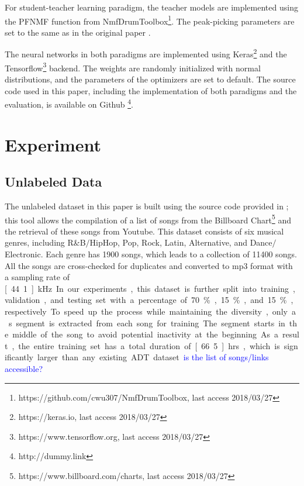 \documentclass{article}
\newcommand{\comment}[1]{{\textcolor{blue}{#1}}}
\begin{document}
For student-teacher learning paradigm, the teacher models are implemented using the PFNMF function from NmfDrumToolbox\footnote{https://github.com/cwu307/NmfDrumToolbox, last access 2018/03/27}. The peak-picking parameters are set to the same as in the original paper \cite{Wu2017}.

The neural networks in both paradigms are implemented using Keras\footnote{https://keras.io, last access 2018/03/27} and the Tensorflow\footnote{https://www.tensorflow.org, last access 2018/03/27} backend. The weights are randomly initialized with normal distributions, and the parameters of the optimizers are set to default. The source code used in this paper, including the implementation of both paradigms and the evaluation, is available on Github \footnote{http://dummy.link}.

\section{Experiment}
\label{sec:experiment}

\subsection{Unlabeled Data}

The unlabeled dataset in this paper is built using the source code provided in \cite{Wu2017}; this tool allows the compilation of a list of songs from the Billboard Chart\footnote{https://www.billboard.com/charts, last access 2018/03/27} and the retrieval of these songs from Youtube. This dataset consists of six musical genres, including R\&B$\slash$HipHop, Pop, Rock, Latin, Alternative, and  Dance$\slash$Electronic. Each genre has 1900 songs, which leads to a collection of 11400 songs. All the songs are cross-checked for duplicates and converted to mp3 format with a sampling rate of \unit[44.1]{kHz}. In our experiments, this dataset is further split into training, validation, and testing set with a percentage of 70\%, 15\%, and 15\%, respectively. To speed up the process while maintaining the diversity, only a \unit[30]{s} segment is extracted from each song for training. The segment starts in the middle of the song to avoid potential inactivity at the beginning. As a result, the entire training set has a total duration of \unit[66.5]{hrs}, which is significantly larger than any existing ADT dataset.\comment{is the list of songs/links accessible?}
\end{document}
